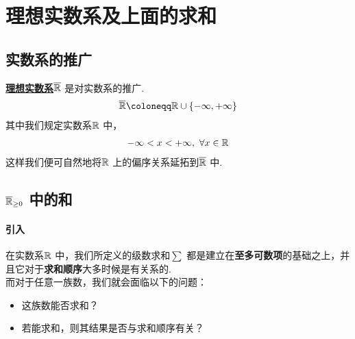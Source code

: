 \newpage
\section{理想实数系及上面的求和}
\subsection{实数系的推广}
	\begin{defn}\label{def 1.9.1}
		\underline{\textbf{理想实数系$\overline{\mathbb{R}}$}} 是对实数系的推广.
		\begin{align}
			\overline{\R} \coloneqq \R \cup \{ -\infty , +\infty \}
		\end{align}
		其中我们规定实数系$\mathbb{R}$ 中，
		\begin{align}
			-\infty < x < +\infty , \,\, \forall x \in \mathbb{R}
		\end{align}
		这样我们便可自然地将$\mathbb{R}$ 上的偏序关系延拓到$\overline{\mathbb{R}}$ 中.
	\end{defn}

\subsection{$\overline{\mathbb{R}}_{\geq 0}$ 中的和}
\paragraph{引入}
	在实数系$\mathbb{R}$ 中，我们所定义的级数求和$\sum$ 都是建立在\textbf{至多可数项}的基础之上，并且它对于\textbf{求和顺序}大多时候是有关系的.\\
	而对于任意一族数，我们就会面临以下的问题：
	\begin{itemize}
		\item 这族数能否求和？
		
		\item 若能求和，则其结果是否与求和顺序有关？
	\end{itemize}

\vspace*{2em}
